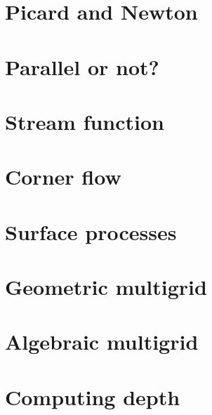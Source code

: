 \section{Picard and Newton \label{ss_nonlinear}}  %
\newpage %
\section{Parallel or not?} \label{sec:parallel}  %
\newpage %
\section{Stream function} \label{sec:streamfunction}  %
\newpage %
\section{Corner flow} \label{sec:cornerflow}  %
\newpage %
\section{Surface processes \label{sec:surfaceprocesses}}  %
\newpage %
\section{Geometric multigrid}  %
\newpage %
\section{Algebraic multigrid}  %
\newpage %
\section{Computing depth \label{ss:depth}}  %
\newpage %

